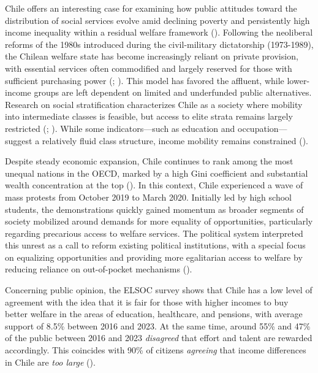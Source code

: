 \documentclass[
  12pt,
]{article}
\begin{document}
Chile offers an interesting case for examining how public attitudes
toward the distribution of social services evolve amid declining poverty
and persistently high income inequality within a residual welfare
framework (). Following
the neoliberal reforms of the 1980s introduced during the civil-military
dictatorship (1973-1989), the Chilean welfare state has become
increasingly reliant on private provision, with essential services often
commodified and largely reserved for those with sufficient purchasing
power (;
). This model has
favored the affluent, while lower-income groups are left dependent on
limited and underfunded public alternatives. Research on social
stratification characterizes Chile as a society where mobility into
intermediate classes is feasible, but access to elite strata remains
largely restricted
(; ).
While some indicators---such as education and occupation---suggest a
relatively fluid class structure, income mobility remains constrained
().

Despite steady economic expansion, Chile continues to rank among the
most unequal nations in the OECD, marked by a high Gini coefficient and
substantial wealth concentration at the top
(). In this context,
Chile experienced a wave of mass protests from October 2019 to March
2020. Initially led by high school students, the demonstrations quickly
gained momentum as broader segments of society mobilized around demands
for more equality of opportunities, particularly regarding precarious
access to welfare services. The political system interpreted this unrest
as a call to reform existing political institutions, with a special
focus on equalizing opportunities and providing more egalitarian access
to welfare by reducing reliance on out-of-pocket mechanisms
().

Concerning public opinion, the ELSOC survey shows that Chile has a low
level of agreement with the idea that it is fair for those with higher
incomes to buy better welfare in the areas of education, healthcare, and
pensions, with average support of 8.5\% between 2016 and 2023. At the
same time, around 55\% and 47\% of the public between 2016 and 2023
\emph{disagreed} that effort and talent are rewarded accordingly. This
coincides with 90\% of citizens \emph{agreeing} that income differences
in Chile are \emph{too large}
().
\end{document}
